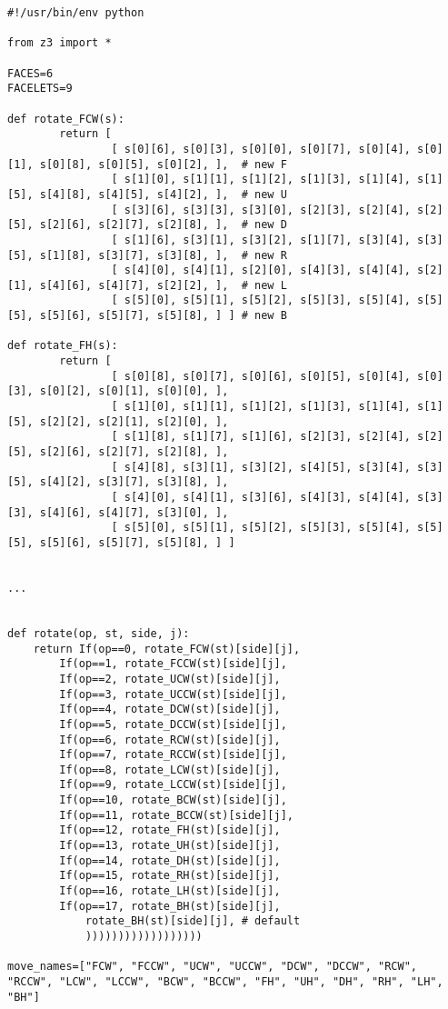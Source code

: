 \begin{lstlisting}
#!/usr/bin/env python

from z3 import *

FACES=6
FACELETS=9

def rotate_FCW(s):
        return [
                [ s[0][6], s[0][3], s[0][0], s[0][7], s[0][4], s[0][1], s[0][8], s[0][5], s[0][2], ],  # new F
                [ s[1][0], s[1][1], s[1][2], s[1][3], s[1][4], s[1][5], s[4][8], s[4][5], s[4][2], ],  # new U
                [ s[3][6], s[3][3], s[3][0], s[2][3], s[2][4], s[2][5], s[2][6], s[2][7], s[2][8], ],  # new D
                [ s[1][6], s[3][1], s[3][2], s[1][7], s[3][4], s[3][5], s[1][8], s[3][7], s[3][8], ],  # new R
                [ s[4][0], s[4][1], s[2][0], s[4][3], s[4][4], s[2][1], s[4][6], s[4][7], s[2][2], ],  # new L
                [ s[5][0], s[5][1], s[5][2], s[5][3], s[5][4], s[5][5], s[5][6], s[5][7], s[5][8], ] ] # new B

def rotate_FH(s):
        return [
                [ s[0][8], s[0][7], s[0][6], s[0][5], s[0][4], s[0][3], s[0][2], s[0][1], s[0][0], ],
                [ s[1][0], s[1][1], s[1][2], s[1][3], s[1][4], s[1][5], s[2][2], s[2][1], s[2][0], ],
                [ s[1][8], s[1][7], s[1][6], s[2][3], s[2][4], s[2][5], s[2][6], s[2][7], s[2][8], ],
                [ s[4][8], s[3][1], s[3][2], s[4][5], s[3][4], s[3][5], s[4][2], s[3][7], s[3][8], ],
                [ s[4][0], s[4][1], s[3][6], s[4][3], s[4][4], s[3][3], s[4][6], s[4][7], s[3][0], ],
                [ s[5][0], s[5][1], s[5][2], s[5][3], s[5][4], s[5][5], s[5][6], s[5][7], s[5][8], ] ]


...


def rotate(op, st, side, j):
	return If(op==0, rotate_FCW(st)[side][j],
		If(op==1, rotate_FCCW(st)[side][j],
		If(op==2, rotate_UCW(st)[side][j],
		If(op==3, rotate_UCCW(st)[side][j],
		If(op==4, rotate_DCW(st)[side][j],
		If(op==5, rotate_DCCW(st)[side][j],
		If(op==6, rotate_RCW(st)[side][j],
		If(op==7, rotate_RCCW(st)[side][j],
		If(op==8, rotate_LCW(st)[side][j],
		If(op==9, rotate_LCCW(st)[side][j],
		If(op==10, rotate_BCW(st)[side][j],
		If(op==11, rotate_BCCW(st)[side][j],
		If(op==12, rotate_FH(st)[side][j],
		If(op==13, rotate_UH(st)[side][j],
		If(op==14, rotate_DH(st)[side][j],
		If(op==15, rotate_RH(st)[side][j],
		If(op==16, rotate_LH(st)[side][j],
		If(op==17, rotate_BH(st)[side][j],
			rotate_BH(st)[side][j], # default
			))))))))))))))))))

move_names=["FCW", "FCCW", "UCW", "UCCW", "DCW", "DCCW", "RCW", "RCCW", "LCW", "LCCW", "BCW", "BCCW", "FH", "UH", "DH", "RH", "LH", "BH"]


\end{lstlisting}
